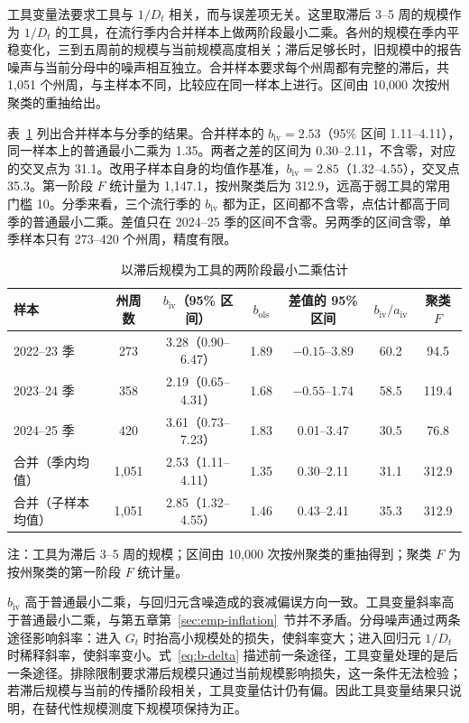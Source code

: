 工具变量法要求工具与 $1/D_t$ 相关，而与误差项无关。这里取滞后 3--5 周的规模作为 $1/D_t$ 的工具，在流行季内合并样本上做两阶段最小二乘\citep{wooldridge2010econometric}。各州的规模在季内平稳变化，三到五周前的规模与当前规模高度相关；滞后足够长时，旧规模中的报告噪声与当前分母中的噪声相互独立。合并样本要求每个州周都有完整的滞后，共 1,051 个州周，与主样本不同，比较应在同一样本上进行。区间由 10,000 次按州聚类的重抽给出。

表~\ref{tab:iv} 列出合并样本与分季的结果。合并样本的 $b_{\mathrm{iv}}=2.53$（95\% 区间 1.11--4.11），同一样本上的普通最小二乘为 1.35。两者之差的区间为 0.30--2.11，不含零，对应的交叉点为 31.1。改用子样本自身的均值作基准，$b_{\mathrm{iv}}=2.85$（1.32--4.55），交叉点 35.3。第一阶段 $F$ 统计量为 1,147.1，按州聚类后为 312.9，远高于弱工具的常用门槛 10。分季来看，三个流行季的 $b_{\mathrm{iv}}$ 都为正，区间都不含零，点估计都高于同季的普通最小二乘。差值只在 2024--25 季的区间不含零。另两季的区间含零，单季样本只有 273--420 个州周，精度有限。

\begin{table}[!tbp]
  \centering
  \caption{以滞后规模为工具的两阶段最小二乘估计}
  \label{tab:iv}
  \small
  \begin{tabular}{@{}lcccccc@{}}
    \toprule
    样本 & 州周数 & $b_{\mathrm{iv}}$（95\% 区间） & $b_{\mathrm{ols}}$ & 差值的 95\% 区间 & $b_{\mathrm{iv}}/a_{\mathrm{iv}}$ & 聚类 $F$ \\
    \midrule
    2022--23 季 & 273 & 3.28（0.90--6.47） & 1.89 & $-0.15$--3.89 & 60.2 & 94.5 \\
    2023--24 季 & 358 & 2.19（0.65--4.31） & 1.68 & $-0.55$--1.74 & 58.5 & 119.4 \\
    2024--25 季 & 420 & 3.61（0.73--7.23） & 1.83 & 0.01--3.47 & 30.5 & 76.8 \\
    合并（季内均值） & 1,051 & 2.53（1.11--4.11） & 1.35 & 0.30--2.11 & 31.1 & 312.9 \\
    合并（子样本均值） & 1,051 & 2.85（1.32--4.55） & 1.46 & 0.43--2.41 & 35.3 & 312.9 \\
    \bottomrule
  \end{tabular}

  \vspace{4pt}
  {\small 注：工具为滞后 3--5 周的规模；区间由 10,000 次按州聚类的重抽得到；聚类 $F$ 为按州聚类的第一阶段 $F$ 统计量。}
\end{table}

$b_{\mathrm{iv}}$ 高于普通最小二乘，与回归元含噪造成的衰减偏误方向一致。工具变量斜率高于普通最小二乘，与第五章第~\ref{sec:emp-inflation}~节并不矛盾。分母噪声通过两条途径影响斜率：进入 $G_t$ 时抬高小规模处的损失，使斜率变大；进入回归元 $1/D_t$ 时稀释斜率，使斜率变小。式~\eqref{eq:b-delta} 描述前一条途径，工具变量处理的是后一条途径。排除限制要求滞后规模只通过当前规模影响损失，这一条件无法检验；若滞后规模与当前的传播阶段相关，工具变量估计仍有偏。因此工具变量结果只说明，在替代性规模测度下规模项保持为正。

